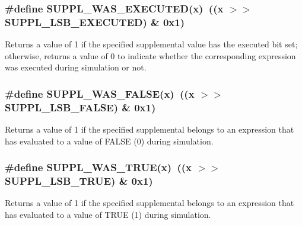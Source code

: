 \subsubsection{\setlength{\rightskip}{0pt plus 5cm}\#define SUPPL\_\-WAS\_\-EXECUTED(x)\ ((x $>$$>$ SUPPL\_\-LSB\_\-EXECUTED) \& 0x1)}\label{group__expr__suppl_a11}


Returns a value of 1 if the specified supplemental value has the executed bit set; otherwise, returns a value of 0 to indicate whether the corresponding expression was executed during simulation or not. 
\subsubsection{\setlength{\rightskip}{0pt plus 5cm}\#define SUPPL\_\-WAS\_\-FALSE(x)\ ((x $>$$>$ SUPPL\_\-LSB\_\-FALSE) \& 0x1)}\label{group__expr__suppl_a15}


Returns a value of 1 if the specified supplemental belongs to an expression that has evaluated to a value of FALSE (0) during simulation. 
\subsubsection{\setlength{\rightskip}{0pt plus 5cm}\#define SUPPL\_\-WAS\_\-TRUE(x)\ ((x $>$$>$ SUPPL\_\-LSB\_\-TRUE) \& 0x1)}\label{group__expr__suppl_a14}


Returns a value of 1 if the specified supplemental belongs to an expression that has evaluated to a value of TRUE (1) during simulation. 